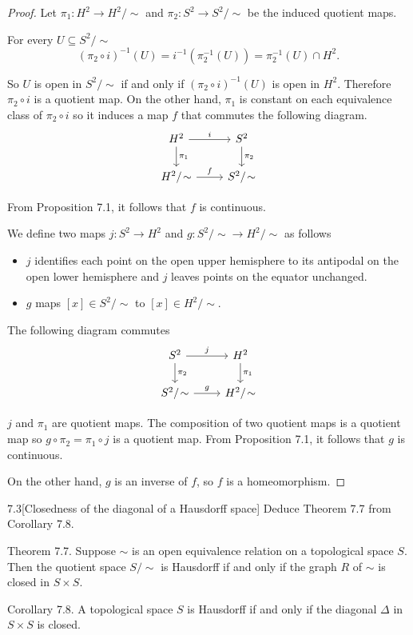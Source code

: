 \begin{proof}
	Let \( \pi_{1}: H^{2} \to H^{2}/\!\sim \) and \( \pi_{2}: S^{2} \to S^{2}/\!\sim \) be the induced quotient maps.

	For every \( U \subseteq S^{2}/\!\sim \)
	\[
		{(\pi_{2} \circ i)}^{-1}(U) = i^{-1}(\pi_{2}^{-1}(U)) = \pi_{2}^{-1}(U) \cap H^{2}.
	\]

	So \( U \) is open in \( S^{2}/\!\sim \) if and only if \(  {(\pi_{2} \circ i)}^{-1}(U) \) is open in \( H^{2} \). Therefore \( \pi_{2} \circ i \) is a quotient map. On the other hand, \( \pi_{1} \) is constant on each equivalence class of \( \pi_{2}\circ i \) so it induces a map \( f \) that commutes the following diagram.
	\[
		\begin{tikzcd}
			H^{2} \arrow{r}{i} \arrow{d}{\pi_{1}} & S^{2} \arrow{d}{\pi_{2}} \\
			H^{2}/\!\sim \arrow{r}{f} & S^{2}/\!\sim
		\end{tikzcd}
	\]

	From Proposition 7.1, it follows that \( f \) is continuous.

	We define two maps \( j: S^{2} \to H^{2} \) and \( g: S^{2}/\!\sim \to H^{2}/\!\sim \) as follows
	\begin{itemize}
		\item \( j \) identifies each point on the open upper hemisphere to its antipodal on the open lower hemisphere and \( j \) leaves points on the equator unchanged.
		\item \( g \) maps \( [x] \in S^{2}/\!\sim \) to \( [x] \in H^{2}/\!\sim \).
	\end{itemize}

	The following diagram commutes
	\[
		\begin{tikzcd}
			S^{2} \arrow{r}{j} \arrow{d}{\pi_{2}} & H^{2} \arrow{d}{\pi_{1}} \\
			S^{2}/\!\sim \arrow{r}{g}         & H^{2}/\!\sim
		\end{tikzcd}
	\]

	\( j \) and \( \pi_{1} \) are quotient maps. The composition of two quotient maps is a quotient map so \( g \circ \pi_{2} = \pi_{1} \circ j \) is a quotient map. From Proposition 7.1, it follows that \( g \) is continuous.

	On the other hand, \( g \) is an inverse of \( f \), so \( f \) is a homeomorphism.
\end{proof}

\begin{problem}{7.3}[Closedness of the diagonal of a Hausdorff space]
Deduce Theorem 7.7 from Corollary 7.8.

Theorem 7.7. Suppose \( \sim \) is an open equivalence relation on a topological space \( S \). Then the quotient space \( S/\!\sim \) is Hausdorff if and only if the graph \( R \) of \( \sim \) is closed in \( S\times S \).

Corollary 7.8. A topological space \( S \) is Hausdorff if and only if the diagonal \( \Delta \) in \( S\times S \) is closed.
\end{problem}

